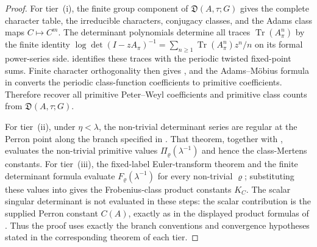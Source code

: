 \documentclass[11pt,a4paper]{amsart}
\theoremstyle{plain}
\theoremstyle{definition}
\theoremstyle{remark}
\DeclareMathOperator{\Tr}{Tr}
\begin{document}
\begin{proof}
  For tier~\textup{(i)}, the finite group component of
  \(\mathfrak D(A,\tau;G)\) gives the complete
  character table, the irreducible characters, conjugacy classes, and the Adams
  class maps \(C\mapsto C^m\).  The determinant polynomials determine all
  traces \(\Tr(A_\pi^n)\) by the finite identity
  \(\log\det(I-zA_\pi)^{-1}=\sum_{n\ge1}\Tr(A_\pi^n)z^n/n\) on its formal
  power-series side.   identifies these traces
  with the periodic twisted fixed-point sums.  Finite character orthogonality
  then gives , and the Adams--M\"obius
  formula in  converts the periodic
  class-function coefficients to primitive coefficients.  Therefore
   recover all primitive Peter--Weyl
  coefficients and primitive class counts from \(\mathfrak D(A,\tau;G)\).

  For tier~\textup{(ii)}, under \(\eta<\lambda\), the non-trivial determinant series are regular at the
  Perron point along the branch specified in
  .  That theorem, together with
  , evaluates
  the non-trivial primitive values \(\Pi_\varrho(\lambda^{-1})\) and hence the
  class-Mertens constants.  For tier~\textup{(iii)}, the fixed-label
  Euler-transform theorem  and the finite determinant formula
   evaluate
  \(F_\varrho(\lambda^{-1})\) for every non-trivial \(\varrho\); substituting
  these values into  gives the
  Frobenius-class product constants \(K_C\).  The scalar singular determinant
  is not evaluated in these steps: the scalar contribution is the supplied
  Perron constant \(C(A)\), exactly as in the displayed product formulas of
  .
  Thus the proof uses exactly the branch conventions and convergence
  hypotheses stated in the corresponding theorem of each tier.


\end{proof}
\end{document}
